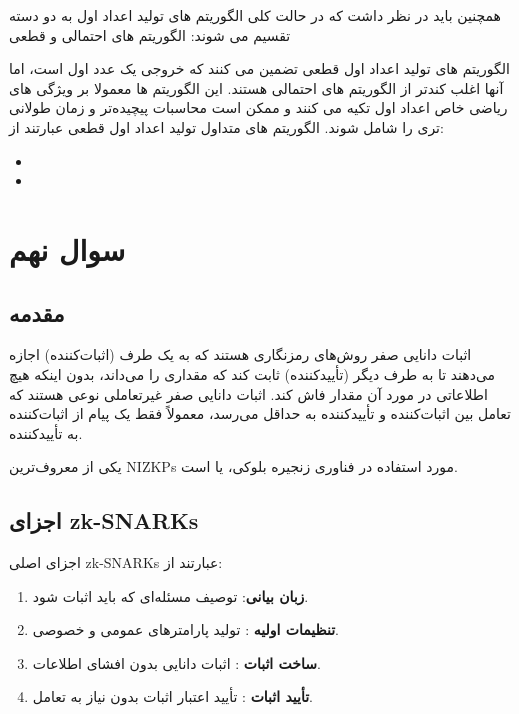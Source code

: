 \documentclass{report}
\begin{document}
همچنین باید در نظر داشت که در حالت کلی الگوریتم های تولید اعداد اول به دو دسته تقسیم می شوند: الگوریتم های احتمالی و قطعی

الگوریتم های تولید اعداد اول قطعی تضمین می کنند که خروجی یک عدد اول است، اما آنها اغلب کندتر از الگوریتم های احتمالی هستند. این الگوریتم ها معمولا بر ویژگی های ریاضی خاص اعداد اول تکیه می کنند و ممکن است محاسبات پیچیدەتر و زمان طولانی تری را شامل شوند. الگوریتم های متداول تولید اعداد اول قطعی عبارتند از:
\begin{itemize}
    \item {}
    \item {}
\end{itemize}

\section{سوال نهم}

\subsection*{مقدمه}
اثبات دانایی صفر  روش‌های رمزنگاری هستند که به یک طرف (اثبات‌کننده) اجازه می‌دهند تا به طرف دیگر (تأییدکننده) ثابت کند که مقداری را می‌داند، بدون اینکه هیچ اطلاعاتی در مورد آن مقدار فاش کند. اثبات دانایی صفر غیرتعاملی  نوعی هستند که تعامل بین اثبات‌کننده و تأییدکننده به حداقل می‌رسد، معمولاً فقط یک پیام از اثبات‌کننده به تأییدکننده.

یکی از معروف‌ترین NIZKPs مورد استفاده در فناوری زنجیره بلوکی، 
یا
است.

\subsection*{اجزای zk-SNARKs}
اجزای اصلی zk-SNARKs عبارتند از:
\begin{enumerate}
    \item \textbf{زبان بیانی}: توصیف مسئله‌ای که باید اثبات شود.
    \item \textbf{تنظیمات اولیه }: تولید پارامترهای عمومی و خصوصی.
    \item \textbf{ساخت اثبات }: اثبات دانایی بدون افشای اطلاعات.
    \item \textbf{تأیید اثبات }: تأیید اعتبار اثبات بدون نیاز به تعامل.
\end{enumerate}
\end{document}
